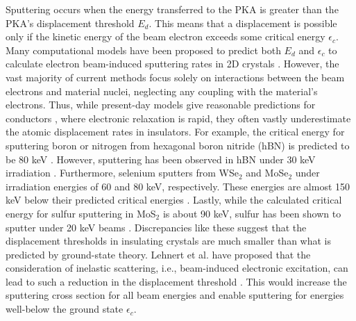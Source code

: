 \documentclass{article}
\begin{document}
Sputtering occurs when the energy transferred to the PKA is greater than
the PKA's displacement threshold $E_d$.
This means that a displacement is possible only if the kinetic energy of the
beam electron exceeds some critical energy $\epsilon_c$.
Many computational models have been proposed to predict both $E_d$ and
$\epsilon_c$ to calculate electron beam-induced sputtering rates in 2D crystals
\cite{Meyer2012, Susi2016, Yoshimura2018, Susi2019}.
However, the vast majority of current
methods focus solely on interactions between the beam electrons and material
nuclei, neglecting any coupling with the material’s electrons.
Thus, while present-day models give reasonable predictions for conductors
\cite{Meyer2012}, where electronic relaxation is rapid, they often vastly
underestimate the atomic displacement rates in insulators.
For example, the critical energy for sputtering boron or nitrogen from
hexagonal boron nitride (hBN) is predicted to be 80 keV \cite{Kotakoski2010}.
However, sputtering has been observed in hBN under 30 keV irradiation
\cite{Cretu2015}.
Furthermore, selenium sputters from WSe$_2$ and MoSe$_2$ under irradiation
energies of 60 and 80 keV, respectively.  These energies are almost 150 keV
below their predicted critical energies \cite{Lin2015, Lehnert2017}.
Lastly, while the calculated critical energy for sulfur sputtering in MoS$_2$
is about 90 keV, sulfur has been shown to sputter under 20 keV beams
\cite{Kretschmer2020}.
Discrepancies like these suggest that the displacement thresholds in insulating
crystals are much smaller than what is predicted by ground-state theory.
Lehnert et al.  have proposed that the consideration of inelastic scattering,
i.e., beam-induced electronic excitation, can lead to such a reduction in the
displacement threshold \cite{Lehnert2017}.
This would increase the sputtering cross section for all beam energies and
enable sputtering for energies well-below the ground state $\epsilon_c$.
\end{document}
